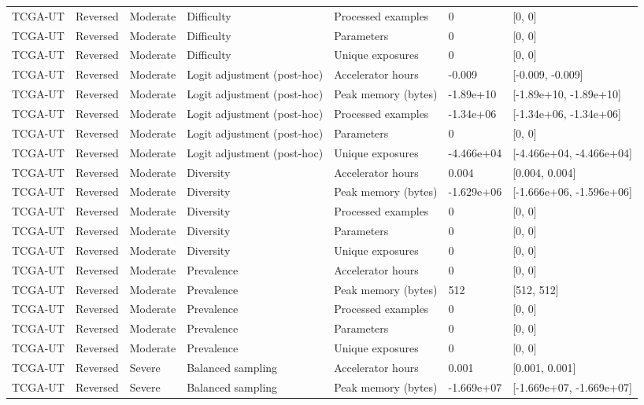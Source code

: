 \begin{longtable}{lllllll}
TCGA-UT & Reversed & Moderate & Difficulty & Processed examples & 0 & [0, 0] \\
TCGA-UT & Reversed & Moderate & Difficulty & Parameters & 0 & [0, 0] \\
TCGA-UT & Reversed & Moderate & Difficulty & Unique exposures & 0 & [0, 0] \\
TCGA-UT & Reversed & Moderate & Logit adjustment (post-hoc) & Accelerator hours & -0.009 & [-0.009, -0.009] \\
TCGA-UT & Reversed & Moderate & Logit adjustment (post-hoc) & Peak memory (bytes) & -1.89e+10 & [-1.89e+10, -1.89e+10] \\
TCGA-UT & Reversed & Moderate & Logit adjustment (post-hoc) & Processed examples & -1.34e+06 & [-1.34e+06, -1.34e+06] \\
TCGA-UT & Reversed & Moderate & Logit adjustment (post-hoc) & Parameters & 0 & [0, 0] \\
TCGA-UT & Reversed & Moderate & Logit adjustment (post-hoc) & Unique exposures & -4.466e+04 & [-4.466e+04, -4.466e+04] \\
TCGA-UT & Reversed & Moderate & Diversity & Accelerator hours & 0.004 & [0.004, 0.004] \\
TCGA-UT & Reversed & Moderate & Diversity & Peak memory (bytes) & -1.629e+06 & [-1.666e+06, -1.596e+06] \\
TCGA-UT & Reversed & Moderate & Diversity & Processed examples & 0 & [0, 0] \\
TCGA-UT & Reversed & Moderate & Diversity & Parameters & 0 & [0, 0] \\
TCGA-UT & Reversed & Moderate & Diversity & Unique exposures & 0 & [0, 0] \\
TCGA-UT & Reversed & Moderate & Prevalence & Accelerator hours & 0 & [0, 0] \\
TCGA-UT & Reversed & Moderate & Prevalence & Peak memory (bytes) & 512 & [512, 512] \\
TCGA-UT & Reversed & Moderate & Prevalence & Processed examples & 0 & [0, 0] \\
TCGA-UT & Reversed & Moderate & Prevalence & Parameters & 0 & [0, 0] \\
TCGA-UT & Reversed & Moderate & Prevalence & Unique exposures & 0 & [0, 0] \\
TCGA-UT & Reversed & Severe & Balanced sampling & Accelerator hours & 0.001 & [0.001, 0.001] \\
TCGA-UT & Reversed & Severe & Balanced sampling & Peak memory (bytes) & -1.669e+07 & [-1.669e+07, -1.669e+07] \\

\end{longtable}
